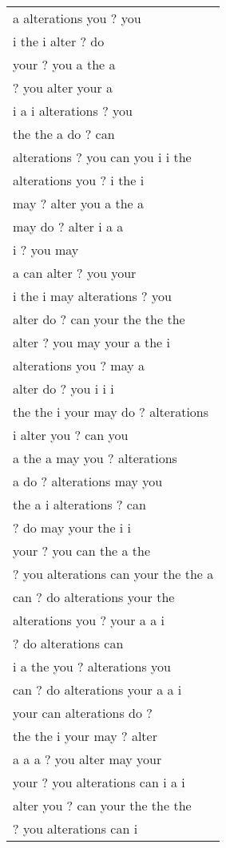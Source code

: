 \documentclass[11pt, a4paper]{article}
\begin{document}
\begin{table}
{\tiny
\begin{tabular}{ |l| }
\hline
a alterations you ? you \\
i the i alter ? do \\
your ? you a the a \\
? you alter your a  \\
i a i alterations ? you \\
the the a do ? can \\
alterations ? you can you i i the \\
alterations you ? i the i \\
may ? alter you a the a \\
may do ? alter i a a \\
i ? you may \\
a can alter ? you your \\
i the i may alterations ? you \\
alter do ? can your the the the \\
alter ? you may your a the i \\
alterations you ? may  a \\
alter do ? you i i i \\
the the i your may do ? alterations \\
i  alter you ? can you \\
a the a may you ? alterations \\
a do ? alterations may you \\
the a i alterations ? can \\
? do may your the i i \\
your ? you can the a the \\
? you alterations can your the the a \\
can ? do alterations your the \\
alterations you ? your a a i \\
? do alterations can \\
i a the you ? alterations you \\
can ? do alterations your a a i \\
your can alterations do ? \\
the the i your may ? alter \\
a a a ? you alter may your \\
your ? you alterations can i a i \\
alter you ? can your the the the \\
? you alterations can i  \\

\end{tabular}}
\end{table}
\end{document}
